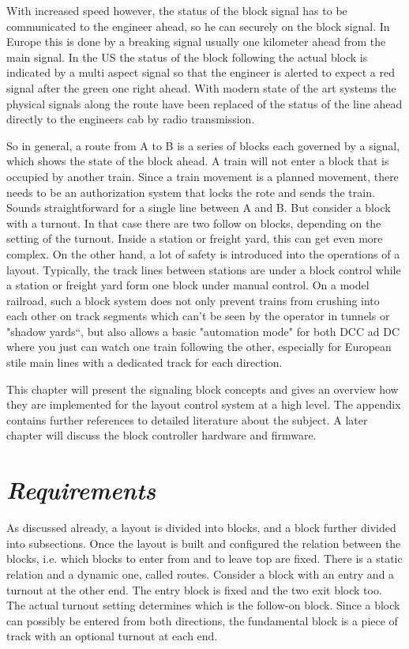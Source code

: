 With increased speed however, the status of the block signal has to be communicated to the engineer ahead, so he can  securely on the block signal. In Europe this is done by a breaking signal usually one kilometer ahead from the main signal. In the US the status of the block following the actual block is indicated by a multi aspect signal so that the engineer is alerted to expect a red signal after the green one right ahead. With modern state of the art systems the physical signals along the route have been replaced of the status of the line ahead directly to the engineers cab by radio transmission.

So in general, a route from A to B is a series of blocks each governed by a signal, which shows the state of the block ahead. A train will not enter a block that is occupied by another train. Since a train movement is a planned movement, there needs to be an authorization system that locks the rote and sends the train. Sounds straightforward for a single line between A and B. But consider a block with a turnout. In that case there are two follow on blocks, depending on the setting of the turnout. Inside a station or freight yard, this can get even more complex. On the other hand, a lot of safety is introduced into the operations of a layout. Typically, the track lines between stations are under a block control while a station or freight yard form one block under manual control. On a model railroad, such a block system does not only prevent trains from crushing into each other on track segments which can’t be seen by the operator in tunnels or "shadow yards“, but also allows a basic "automation mode" for both DCC ad DC where you just can watch one train following the other, especially for European stile main lines with a dedicated track for each direction.

This chapter will present the signaling block concepts and gives an overview how they are implemented for the layout control system at a high level. The appendix contains further references to detailed literature about the subject. A later chapter will discuss the block controller hardware and firmware.

\section{\textit{Requirements}}

As discussed already, a layout is divided into blocks, and a block further divided into subsections. Once the layout is built and configured the relation between the blocks, i.e. which blocks to enter from and to leave top are fixed. There is a static relation and a dynamic one, called routes. Consider a block with an entry and a turnout at the other end. The entry block is fixed and the two exit block too. The actual turnout setting determines which is the follow-on block. Since a block can possibly be entered from both directions, the fundamental block is a piece of track with an optional turnout at each end.

